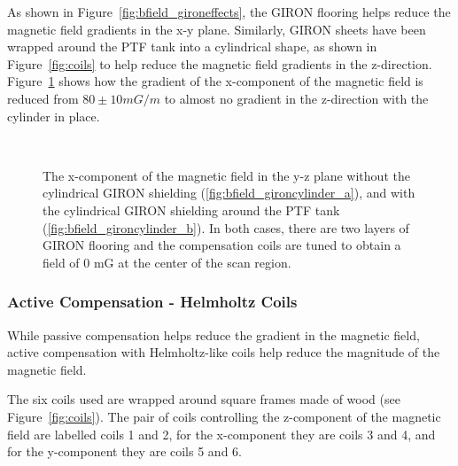 As shown in Figure~\ref{fig:bfield_gironeffects}, the GIRON flooring helps reduce the magnetic field gradients in the x-y plane. Similarly, GIRON sheets have been wrapped around the PTF tank into a cylindrical shape, as shown in Figure~\ref{fig:coils} to help reduce the magnetic field gradients in the z-direction. Figure~\ref{fig:bfield_gironcylinder} shows how the gradient of the x-component of the magnetic field is reduced from $ 80\pm10 mG/m $ to almost no gradient in the z-direction with the cylinder in place.
%
\begin{figure}[htbp]
  \begin{center}
    \\
    \vspace{-3 mm}
  \caption{The x-component of the magnetic field in the y-z plane without the cylindrical GIRON shielding (\ref{fig:bfield_gironcylinder_a}), and with the cylindrical GIRON shielding around the PTF tank (\ref{fig:bfield_gironcylinder_b}). In both cases, there are two layers of GIRON flooring and the compensation coils are tuned to obtain a field of 0 mG at the center of the scan region.}
  \label{fig:bfield_gironcylinder}
  \end{center}
\end{figure}
%

\subsubsection{Active Compensation - Helmholtz Coils}

While passive compensation helps reduce the gradient in the magnetic field, active compensation with Helmholtz-like coils help reduce the magnitude of the magnetic field.

The six coils used are wrapped around square frames made of wood (see Figure~\ref{fig:coils}). The pair of coils controlling the z-component of the magnetic field are labelled coils 1 and 2, for the x-component they are coils 3 and 4, and for the y-component they are coils 5 and 6.

